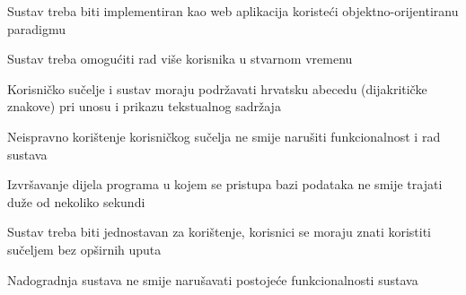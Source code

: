 			 \begin{packed_item}
			 \item Sustav treba biti implementiran kao web aplikacija koristeći objektno-orijentiranu paradigmu
			 \item Sustav treba omogućiti rad više korisnika u stvarnom vremenu
			 \item Korisničko sučelje i sustav moraju podržavati hrvatsku abecedu (dijakritičke znakove) pri unosu i prikazu tekstualnog sadržaja
			 \item  Neispravno korištenje korisničkog sučelja ne smije narušiti funkcionalnost i rad sustava
			 \item Izvršavanje dijela programa u kojem se pristupa bazi podataka ne smije trajati duže od nekoliko sekundi
			 \item Sustav treba biti jednostavan za korištenje, korisnici se moraju znati koristiti sučeljem bez opširnih uputa
			 \item Nadogradnja sustava ne smije narušavati postojeće funkcionalnosti sustava
			\end{packed_item}
		\eject